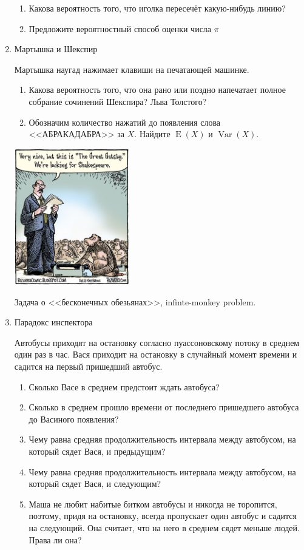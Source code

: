 \documentclass{tufte-handout}
\DeclareMathOperator{\Var}{Var}
\DeclareMathOperator{\E}{E}
\begin{document}
\begin{enumerate}
\begin{enumerate}
\item Какова вероятность того, что иголка пересечёт какую-нибудь линию?
\item Предложите вероятностный способ оценки числа $\pi$
\end{enumerate}

\item Мартышка и Шекспир

Мартышка наугад нажимает клавиши на печатающей машинке. 


\begin{enumerate}
\item Какова вероятность того, что она рано или поздно напечатает полное собрание сочинений Шекспира? Льва Толстого?
\item Обозначим количество нажатий до появления слова <<АБРАКАДАБРА>> за $X$. Найдите $\E(X)$ и $\Var(X)$.
\end{enumerate}


\begin{marginfigure}
  \includegraphics[width=5cm]{gatsby}
  \caption{Задача о <<бесконечных обезьянах>>, infinte-monkey problem. }
\end{marginfigure}

\item Парадокс инспектора

Автобусы приходят на остановку согласно пуассоновскому потоку в среднем один раз в час. Вася приходит на остановку в случайный момент времени и садится на первый пришедший автобус. 

\begin{enumerate}
\item Сколько Васе в среднем предстоит ждать автобуса?
\item Сколько в среднем прошло времени от последнего пришедшего автобуса до Васиного появления?
\item Чему равна средняя продолжительность интервала между автобусом, на который сядет Вася, и предыдущим?
\item Чему равна средняя продолжительность интервала между автобусом, на который сядет Вася, и следующим?
\item Маша не любит набитые битком автобусы и никогда не торопится, поэтому, придя на остановку, всегда пропускает один автобус и садится на следующий. Она считает, что на него в среднем сядет меньше людей. Права ли она?
\end{enumerate}


\end{enumerate}
\end{document}
